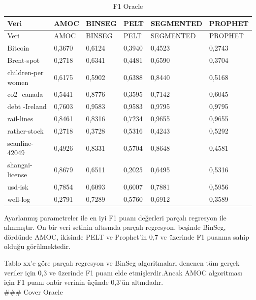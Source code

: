 \documentclass[12pt,twoside]{deuthesis}
\begin{document}
\begin{longtable}[]{@{}llllll@{}}
\caption{\label{tab:nvar5} F1 Oracle}\tabularnewline
\toprule\noalign{}
Veri & AMOC & BINSEG & PELT & SEGMENTED & PROPHET \\
\midrule\noalign{}
\endfirsthead
\toprule\noalign{}
Veri & AMOC & BINSEG & PELT & SEGMENTED & PROPHET \\
\midrule\noalign{}
\endhead
\bottomrule\noalign{}
\endlastfoot
Bitcoin & 0,3670 & 0,6124 & 0,3940 & 0,4523 & 0,2743 \\
Brent-spot & 0,2718 & 0,6341 & 0,4481 & 0,6590 & 0,3704 \\
children-per women & 0,6175 & 0,5902 & 0,6388 & 0,8440 & 0,5168 \\
co2- canada & 0,5441 & 0,8776 & 0,3595 & 0,7142 & 0,6045 \\
debt -Ireland & 0,7603 & 0,9583 & 0,9583 & 0,9795 & 0,9795 \\
rail-lines & 0,8461 & 0,8316 & 0,7234 & 0,9655 & 0,9655 \\
rather-stock & 0,2718 & 0,3728 & 0,5316 & 0,4243 & 0,5292 \\
scanline-42049 & 0,4926 & 0,8331 & 0,5704 & 0,8648 & 0,4581 \\
shangai-license & 0,8679 & 0,6511 & 0,2025 & 0,6495 & 0,5316 \\
usd-isk & 0,7854 & 0,6093 & 0,6007 & 0,7881 & 0,5956 \\
well-log & 0,2791 & 0,7289 & 0,5760 & 0,6912 & 0,3589 \\
\end{longtable}

Ayarlanmış parametreler ile en iyi F1 puanı değerleri parçalı regresyon ile alınmıştır. On bir veri setinin altısında parçalı regresyon, beşinde BinSeg, dördünde AMOC, ikisinde PELT ve Prophet'in 0,7 ve üzerinde F1 puanına sahip olduğu görülmektedir.

Tablo xx'e göre parçalı regresyon ve BinSeg algoritmaları denenen tüm gerçek veriler için 0,3 ve üzerinde F1 puanı elde etmişlerdir.Ancak AMOC algoritması için F1 puanı onbir verinin üçünde 0,3'ün altındadır.\\
\#\#\# Cover Oracle
\end{document}
